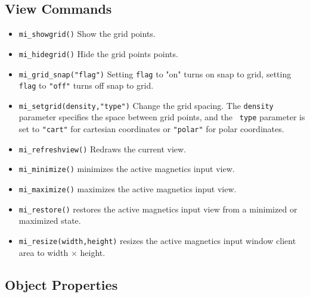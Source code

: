 \subsection{View Commands}

\begin{itemize}
\item{\verb+mi_showgrid()+} Show the grid points.
\item{\verb+mi_hidegrid()+} Hide the grid points points.
\item{\verb+mi_grid_snap("flag")+}
Setting {\tt flag} to "on" turns on snap to grid, setting {\tt
flag} to {\tt "off"} turns off snap to grid.
\item{\verb+mi_setgrid(density,"type")+} Change the grid spacing.  The {\tt density}
parameter specifies the space between grid points, and the {\tt
type} parameter is set to {\tt "cart"} for cartesian coordinates or
{\tt "polar"} for polar coordinates.
\item{\tt mi\_refreshview()} Redraws the current view.
\item{\tt mi\_minimize()} minimizes the active magnetics input view.
\item{\tt mi\_maximize()} maximizes the active magnetics input view.
\item{\tt mi\_restore()} restores the active magnetics input view from a
 minimized or maximized state.
\item{\tt mi\_resize(width,height)} resizes the active magnetics input
 window client area to width $\times$ height.
\end{itemize}

\subsection{Object Properties}

